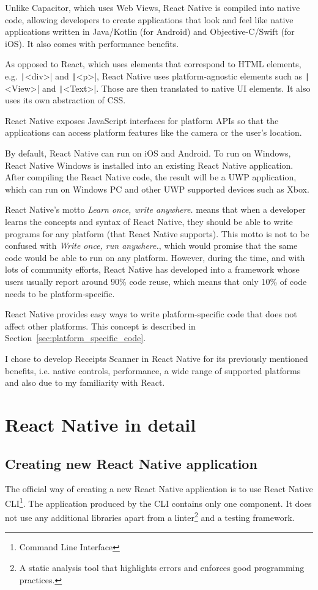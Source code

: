 \documentclass[
  digital, %
  table,   %
  oneside, %
  lof,     %
  lot,     %
]{fithesis3}
\newcommand{\code}[1]{\texttt|#1|} %
\begin{document}
Unlike Capacitor, which uses Web Views, React Native is compiled into native code, allowing developers to create applications that look and feel like native applications written in Java/Kotlin (for Android) and Objective-C/Swift (for iOS). It also comes with performance benefits. 

As opposed to React, which uses elements that correspond to HTML elements, e.g. \code{<div>} and \code{<p>}, React Native uses platform-agnostic elements such as \code{<View>} and \code{<Text>}. Those are then translated to native UI elements. It also uses its own abstraction of CSS.

React Native exposes JavaScript interfaces for platform APIs so that the applications can access platform features like the camera or the user’s location.

By default, React Native can run on iOS and Android. To run on Windows, React Native Windows is installed into an existing React Native application. After compiling the React Native code, the result will be a UWP application, which can run on Windows PC and other UWP supported devices such as Xbox.

React Native's motto \textit{Learn once, write anywhere.} means that when a developer learns the concepts and syntax of React Native, they should be able to write programs for any platform (that React Native supports). This motto is not to be confused with \textit{Write once, run anywhere.}, which would promise that the same code would be able to run on any platform. However, during the time, and with lots of community efforts, React Native has developed into a framework whose users usually report around 90\% code reuse, which means that only 10\% of code needs to be platform-specific. 

React Native provides easy ways to write platform-specific code that does not affect other platforms. This concept is described in Section~\ref{sec:platform_specific_code}.

I chose to develop Receipts Scanner in React Native for its previously mentioned benefits, i.e. native controls, performance, a wide range of supported platforms and also due to my familiarity with React.

\chapter{React Native in detail}

\section{Creating new React Native application}
The official way of creating a new React Native application is to use React Native CLI\footnote{Command Line Interface}. The application produced by the CLI contains only one component. It does not use any additional libraries apart from a linter\footnote{A static analysis tool that highlights errors and enforces good programming practices.} and a testing framework.
\end{document}
